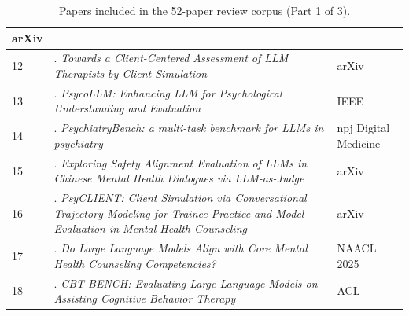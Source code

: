 \begin{table}[p]
\begin{tabular}{p{0.8cm}p{11.1cm}p{3.0cm}}
arXiv \\
\midrule
12 &
\citealp{Wang2024Towards}. \textit{Towards a Client-Centered Assessment of LLM Therapists by Client Simulation} &
arXiv \\
\midrule
13 &
\citealp{Hu2024PsycoLLM}. \textit{PsycoLLM: Enhancing LLM for Psychological Understanding and Evaluation} &
IEEE \\
\midrule
14 &
\citealp{Fouda2026PsychiatryBench}. \textit{PsychiatryBench: a multi-task benchmark for LLMs in psychiatry} &
npj Digital Medicine \\
\midrule
15 &
\citealp{Cai2026Exploring}. \textit{Exploring Safety Alignment Evaluation of LLMs in Chinese Mental Health Dialogues via LLM-as-Judge} &
arXiv \\
\midrule
16 &
\citealp{Qiu2026PsyCLIENT}. \textit{PsyCLIENT: Client Simulation via Conversational Trajectory Modeling for Trainee Practice and Model Evaluation in Mental Health Counseling} &
arXiv \\
\midrule
17 &
\citealp{Nguyen2025Do}. \textit{Do Large Language Models Align with Core Mental Health Counseling Competencies?} &
NAACL 2025 \\
\midrule
18 &
\citealp{Zhang2025CBT-BENCH}. \textit{CBT-BENCH: Evaluating Large Language Models on Assisting Cognitive Behavior Therapy} &
ACL \\
\bottomrule
\end{tabular}
\caption{Papers included in the 52-paper review corpus (Part 1 of 3).}
\label{tab:reviewed-corpus-1}
\end{table}

